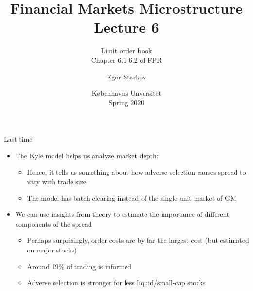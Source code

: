 \documentclass[english,10pt
,aspectratio=169
]{beamer}
\title{Financial Markets Microstructure \\ Lecture 6}
\subtitle{Limit order book\\
	Chapter 6.1-6.2 of FPR}
\author{Egor Starkov}
\date{K{\o}benhavns Unversitet \\
	Spring 2020}
\begin{document}
\frame[plain]{\titlepage}


\begin{frame}{Last time}
	\begin{itemize}
		\item The Kyle model helps us analyze market depth:
		\begin{itemize}
			\item Hence, it tells us something about how adverse selection causes spread to vary with trade size
			\item The model has batch clearing instead of the single-unit market of GM
		\end{itemize}
		\item We can use insights from theory to estimate the importance of different components of the spread
		\begin{itemize}
			\item Perhaps surprisingly, order costs are by far the largest cost (but estimated on major stocks)
			\item Around 19\% of trading is informed
			\item Adverse selection is stronger for less liquid/small-cap stocks
		\end{itemize}
	\end{itemize}
\end{frame}


\end{document}
